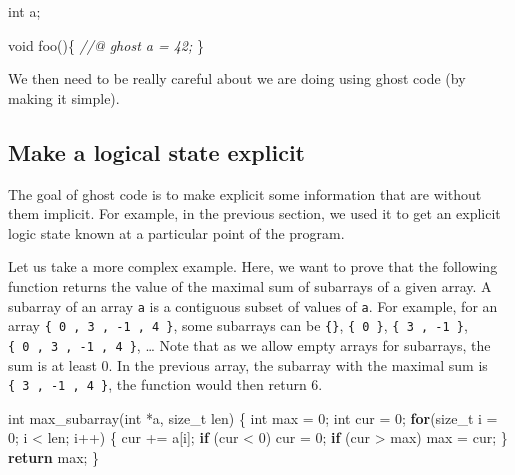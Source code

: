 \documentclass[12pt,francais,]{scrbook}
\newenvironment{Shaded}{}{}
\newcommand{\KeywordTok}[1]{\textcolor[rgb]{0.00,0.44,0.13}{\textbf{{#1}}}}
\newcommand{\DataTypeTok}[1]{\textcolor[rgb]{0.56,0.13,0.00}{{#1}}}
\newcommand{\DecValTok}[1]{\textcolor[rgb]{0.25,0.63,0.44}{{#1}}}
\newcommand{\CommentTok}[1]{\textcolor[rgb]{0.38,0.63,0.69}{\textit{{#1}}}}
\newcommand{\NormalTok}[1]{{#1}}
\begin{document}
\begin{footnotesize}\begin{Shaded}
\begin{Highlighting}[]
\DataTypeTok{int} \NormalTok{a;}

\DataTypeTok{void} \NormalTok{foo()\{}
  \CommentTok{//@ ghost a = 42;}
\NormalTok{\}}
\end{Highlighting}
\end{Shaded}\end{footnotesize}

We then need to be really careful about we are doing using ghost code
(by making it simple).

\subsection{Make a logical state
explicit}\label{make-a-logical-state-explicit}

The goal of ghost code is to make explicit some information that are
without them implicit. For example, in the previous section, we used it
to get an explicit logic state known at a particular point of the
program.

Let us take a more complex example. Here, we want to prove that the
following function returns the value of the maximal sum of subarrays of
a given array. A subarray of an array \texttt{a} is a contiguous subset
of values of \texttt{a}. For example, for an array
\texttt{\{\ 0\ ,\ 3\ ,\ -1\ ,\ 4\ \}}, some subarrays can be
\texttt{\{\}}, \texttt{\{\ 0\ \}}, \texttt{\{\ 3\ ,\ -1\ \}},
\texttt{\{\ 0\ ,\ 3\ ,\ -1\ ,\ 4\ \}}, \ldots{} Note that as we allow
empty arrays for subarrays, the sum is at least 0. In the previous
array, the subarray with the maximal sum is
\texttt{\{\ 3\ ,\ -1\ ,\ 4\ \}}, the function would then return 6.

\begin{footnotesize}\begin{Shaded}
\begin{Highlighting}[]
\DataTypeTok{int} \NormalTok{max_subarray(}\DataTypeTok{int} \NormalTok{*a, size_t len) \{}
  \DataTypeTok{int} \NormalTok{max = }\DecValTok{0}\NormalTok{;}
  \DataTypeTok{int} \NormalTok{cur = }\DecValTok{0}\NormalTok{;}
  \KeywordTok{for}\NormalTok{(size_t i = }\DecValTok{0}\NormalTok{; i < len; i++) \{}
    \NormalTok{cur += a[i];}
    \KeywordTok{if} \NormalTok{(cur < }\DecValTok{0}\NormalTok{)   cur = }\DecValTok{0}\NormalTok{;}
    \KeywordTok{if} \NormalTok{(cur > max) max = cur;}
  \NormalTok{\}}
  \KeywordTok{return} \NormalTok{max;}
\NormalTok{\}}
\end{Highlighting}
\end{Shaded}\end{footnotesize}
\end{document}
